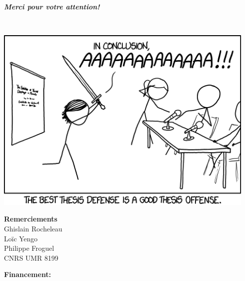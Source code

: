 \documentclass[10pt,  xcolors={RGB}, hyperref={%
    pdfpagelabels=false,
    colorlinks=true,
    pdftex=true,
    bookmarks=true,
    bookmarksopen=true,
    hyperfootnotes=true}]{beamer}
\newcommand\green[1]{{\color{springgreen3}\textbf{#1}}}
\newif\ifsecpart
\begin{document}
\secparttrue
\begin{frame}%
\begin{center}
    \vspace{0.5cm}
    {\huge\par{\slshape\bfseries{Merci pour votre attention!}}}\\[0.5cm]
	\begin{minipage}[c]{0.475\columnwidth}
	\begin{center}
	{\includegraphics[width=0.95\textwidth]{images/thesis_defense.png}}%
	\end{center}
	\end{minipage}%
	\hfill%
	\begin{minipage}[c]{0.475\columnwidth}%
	\begin{center}
	 {\scriptsize\par{%
            \green{Remerciements}\\
            Ghislain Rocheleau\\
            Loïc Yengo\\
            Philippe Froguel\\
            CNRS UMR 8199
        }}
        \end{center}
	\end{minipage}
        \vspace{0.75cm}
        {\tiny
        \begin{singlespace*}
            \par{\green{Financement:}\\
}
\end{singlespace*}}
\end{center}
\end{frame}
\end{document}
